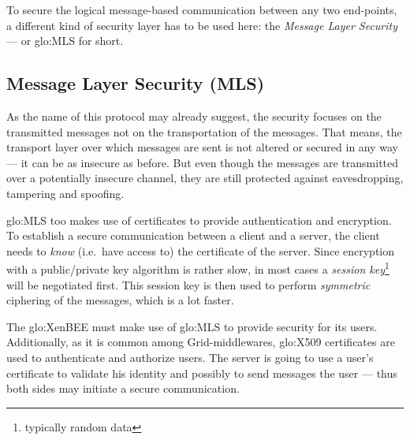 To  secure  the  logical   message-based  communication  between  any  two
end-points, a  different kind of security  layer has to be  used here: the
\emph{Message Layer Security} --- or \gls{glo:MLS} for short.

\subsection{Message Layer Security (MLS)}

As the name of this protocol  may already suggest, the security focuses on
the transmitted messages not on  the transportation of the messages.  That
means, the transport layer over which  messages are sent is not altered or
secured in any way  --- it can be as insecure as  before.  But even though
the messages are transmitted over a potentially insecure channel, they are
still protected against eavesdropping, tampering and spoofing.

\gls{glo:MLS} too makes use  of certificates to provide authentication and
encryption. To  establish a  secure communication between  a client  and a
server,  the  client  needs  to  \emph{know}  (i.e.~have  access  to)  the
certificate  of the server.   Since encryption  with a  public/private key
algorithm   is    rather   slow,    in   most   cases    a   \emph{session
  key}\footnote{typically  random data}  will be  negotiated  first.  This
session  key is  then used  to perform  \emph{symmetric} ciphering  of the
messages, which is a lot faster.

\bigskip

The \gls{glo:XenBEE}  must make use  of \gls{glo:MLS} to  provide security
for  its users.   Additionally, as  it is  common  among Grid-middlewares,
\gls{glo:X509}  certificates  are   used  to  authenticate  and  authorize
users. The  server is going  to use a  user's certificate to  validate his
identity and  possibly to send messages  the user --- thus  both sides may
initiate a secure communication.


